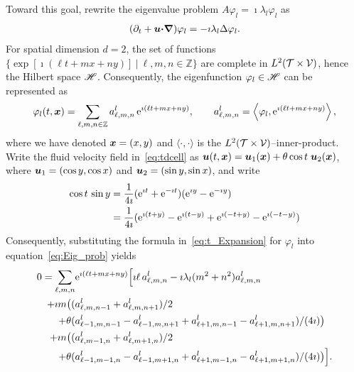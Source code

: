 \documentclass[amsa]{ipart}
\begin{document}
Toward this goal, rewrite the eigenvalue problem $A\varphi_l=\imath\lambda_l\varphi_l$ as         
%
\begin{align}\label{eq:Eig_prob}
  (\partial_t+\vecu \bcdot\bnabla )\varphi_l=-\imath\lambda_l\Delta\varphi_l.
\end{align}
%
For spatial dimension $d=2$, the set of functions
$\{\exp[\imath(\ell t+mx+ny)] \ |\  \ell,m,n\in\mathbb{Z}\}$ are 
complete in $L^2(\mathcal{T}\times\mathcal{V})$, hence the Hilbert space $\mathscr{H}$. Consequently,
the eigenfunction $\varphi_l\in\mathscr{H}$ can be represented as
%
\begin{align}\label{eq:t_Expansion}
  \varphi_l(t,\vecx)=\sum_{\ell,m,n\in\mathbb{Z}} a^l_{\ell,m,n}\,\e^{\imath(\ell t+mx+ny)},
  \qquad
  a^l_{\ell,m,n}=\left\langle\varphi_l,\e^{\imath(\ell t+mx+ny)}\right\rangle,
\end{align}
%
where we have denoted $\boldsymbol{x}=(x,y)$ and $\langle\cdot,\cdot\rangle$ is the
$L^2(\mathcal{T}\times\mathcal{V})$--inner-product. Write the fluid velocity field
in~\eqref{eq:tdcell} as  
$\boldsymbol{u}(t,\boldsymbol{x})=\boldsymbol{u}_1(\boldsymbol{x})+\theta\cos{t}\;\boldsymbol{u}_2(\boldsymbol{x})$, where
$\boldsymbol{u}_1=(\cos{y},\cos{x})$ and $\boldsymbol{u}_2=(\sin{y},\sin{x})$, and write
%
\begin{align}
  \cos{t}\,\sin{y}&=\frac{1}{4\imath}(\e^{\imath t}+\e^{-\imath t})(\e^{\imath y}-\e^{-\imath y})
                \\
                &=\frac{1}{4\imath}(\e^{\imath (t+y)}-\e^{\imath (t-y)}+\e^{\imath
                  (-t+y)}-\e^{\imath (-t-y)})
                \notag
\end{align}
%
Consequently, substituting the formula in~\eqref{eq:t_Expansion} for $\varphi_l$
 into equation~\eqref{eq:Eig_prob} yields
%
\begin{align}\label{eq:Fourier_Cell_Problem}
 0=\sum_{\ell,m,n} &\e^{\imath(\ell t+mx+ny)}\Big[
     \imath\ell\,a^l_{\ell,m,n}-\imath\lambda_l(m^2+n^2)a^l_{\ell,m,n}
     \\\notag
     +\imath m\big((&a^l_{\ell,m,n-1}+a^l_{\ell,m,n+1})/2
     \\\notag
        +\theta (&a^l_{\ell-1,m,n-1}-a^l_{\ell-1,m,n+1}+a^l_{\ell+1,m,n-1}-a^l_{\ell+1,m,n+1})/(4\imath)
        \big)
        \\\notag
     +\imath n\big((&a^l_{\ell,m-1,n}+a^l_{\ell,m+1,n})/2
        \\\notag
        +\theta(&a^l_{\ell-1,m-1,n}-a^l_{\ell-1,m+1,n}+a^l_{\ell+1,m-1,n}-a^l_{\ell+1,m+1,n})/(4\imath)  
         \big)
 \Big].
 \notag
\end{align}
\end{document}
